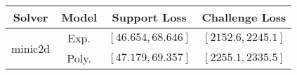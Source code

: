 \begin{tabular}{cc|c|c} 
\hline 
 Solver & Model & Support Loss  & Challenge Loss \tabularnewline\hline 
\hline 
\multirow{2}{*}{minic2d} & Exp. & $\mathbf{\left[46.654,68.646\right]}$ & $\mathbf{\left[2152.6,2245.1\right]}$ \tabularnewline 
 & Poly. & $\left[47.179,69.357\right]$ & $\left[2255.1,2335.5\right]$ \tabularnewline 
\hline 
\end{tabular} 

